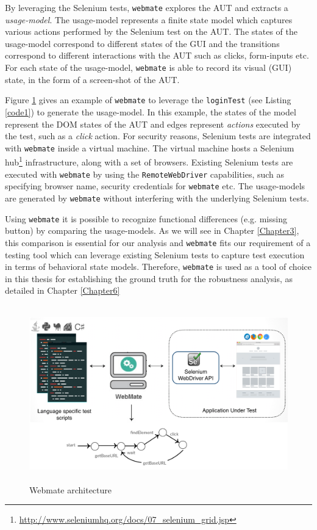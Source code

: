 By leveraging the Selenium tests, \texttt{webmate} explores the AUT and extracts a \textit{usage-model}. The usage-model represents a finite state model which captures various actions performed by the Selenium test on the AUT. The states of the usage-model correspond to different states of the GUI and the transitions correspond to different interactions with the AUT such as clicks, form-inputs etc. For each state of the usage-model, \texttt{webmate} is able to record its visual (GUI) state, in the form of a screen-shot of the AUT.

Figure \ref{fig:webmateArchitecture} gives an example of \texttt{webmate} to leverage the \texttt{loginTest} (see Listing \ref{code1}) to generate the usage-model. In this example, the states of the model represent the DOM states of the AUT and edges represent \textit{actions} executed by the test, such as a \textit{click} action. For security reasons, Selenium tests are integrated with \texttt{webmate} inside a virtual machine. The virtual machine hosts a Selenium hub\footnote{\url{http://www.seleniumhq.org/docs/07_selenium_grid.jsp}} infrastructure, along with a set of browsers. Existing Selenium tests are executed with \texttt{webmate} by using the \texttt{RemoteWebDriver} capabilities, such as specifying browser name, security credentials for \texttt{webmate} etc. The usage-models are generated by \texttt{webmate} without interfering with the underlying Selenium tests. 

Using \texttt{webmate} it is possible to recognize functional differences (e.g. missing button) by comparing the usage-models. As we will see in Chapter \ref{Chapter3}, this comparison is essential for our analysis and \texttt{webmate} fits our requirement of a testing tool which can leverage existing Selenium tests to capture test execution in terms of behavioral state models. Therefore, \texttt{webmate} is used as a tool of choice in this thesis for establishing the ground truth for the robustness analysis, as detailed in Chapter \ref{Chapter6}

\begin{figure}
\makeatletter 
\makeatother
    \centering
  \includegraphics[width=5.5in,height=3in]{./Figures/webmate-state-graph}
  \caption{Webmate architecture}
  \label{fig:webmateArchitecture} 
\end{figure}


